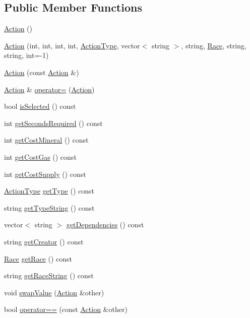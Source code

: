\subsection*{Public Member Functions}
\begin{DoxyCompactItemize}
\item 
\hyperlink{classghost_1_1Action_a82c7d6aec3d39fd036395fcf563fd2c5}{Action} ()
\item 
\hyperlink{classghost_1_1Action_a689772909dd44aed12c89150b2728a2f}{Action} (int, int, int, int, \hyperlink{namespaceghost_a7c0deb8266504feb7d025903f2b77693}{Action\-Type}, vector$<$ string $>$, string, \hyperlink{namespaceghost_a8b1db75c40c6980adcf244ddccc0324b}{Race}, string, string, int=-\/1)
\item 
\hyperlink{classghost_1_1Action_af83e86975dc608cb9ebe7447fa2b368a}{Action} (const \hyperlink{classghost_1_1Action}{Action} \&)
\item 
\hyperlink{classghost_1_1Action}{Action} \& \hyperlink{classghost_1_1Action_a56179a064666c0b895daa0006ebe26d1}{operator=} (\hyperlink{classghost_1_1Action}{Action})
\item 
bool \hyperlink{classghost_1_1Action_a3a9c93b2d9ba2181e74fddceaec84a34}{is\-Selected} () const 
\item 
int \hyperlink{classghost_1_1Action_a0a434058b17b4235ffd2325c88056751}{get\-Seconds\-Required} () const 
\item 
int \hyperlink{classghost_1_1Action_ad8f83b004d632ef058e2aced097af7f0}{get\-Cost\-Mineral} () const 
\item 
int \hyperlink{classghost_1_1Action_a46881c65b49922ee92afa96ac2c38d17}{get\-Cost\-Gas} () const 
\item 
int \hyperlink{classghost_1_1Action_ae1f8a3db9caafbcaa2039600f11eafd7}{get\-Cost\-Supply} () const 
\item 
\hyperlink{namespaceghost_a7c0deb8266504feb7d025903f2b77693}{Action\-Type} \hyperlink{classghost_1_1Action_a3d80b97f17c4e29a23a19962d8adfaa6}{get\-Type} () const 
\item 
string \hyperlink{classghost_1_1Action_a806f43d37dfd110a1ed88e643db9845d}{get\-Type\-String} () const 
\item 
vector$<$ string $>$ \hyperlink{classghost_1_1Action_a8396f1b683a8d6a20c5007aab5e1c02b}{get\-Dependencies} () const 
\item 
string \hyperlink{classghost_1_1Action_a7e9e96cdfbc4ed561d782d2af51fb1ab}{get\-Creator} () const 
\item 
\hyperlink{namespaceghost_a8b1db75c40c6980adcf244ddccc0324b}{Race} \hyperlink{classghost_1_1Action_a67245bd8400e2dc6db7f16b512df145d}{get\-Race} () const 
\item 
string \hyperlink{classghost_1_1Action_ab22270eb1800b12ca2d2d6259552d974}{get\-Race\-String} () const 
\item 
void \hyperlink{classghost_1_1Action_a2928069f4b38a67ec7a955ee9e7783f2}{swap\-Value} (\hyperlink{classghost_1_1Action}{Action} \&other)
\item 
bool \hyperlink{classghost_1_1Action_aec7e9119cc76fe0aecbd1b43fd35915a}{operator==} (const \hyperlink{classghost_1_1Action}{Action} \&other)
\end{DoxyCompactItemize}
